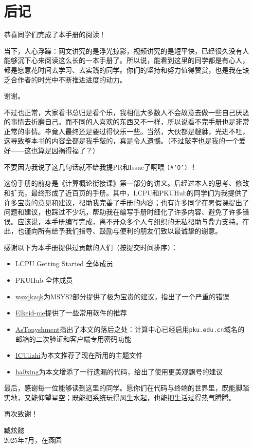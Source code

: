\documentclass[../main.tex]{subfiles}
\begin{document}
\chapter{后记}

恭喜同学们完成了本手册的阅读！

当下，人心浮躁：网文讲究的是浮光掠影，视频讲究的是短平快，已经很久没有人能够沉下心来阅读这么长的一本手册了。所以说，能看到这里的同学都是有心人，都是愿意花时间去学习、去实践的同学。你们的坚持和努力值得赞赏，也是我在缺乏合作者的时光中不断推进进度的动力。

谢谢。

不过也正常，大家看书总归是看个乐，我相信大多数人不会故意去做一些自己厌恶的事情去折磨自己。而不同的人喜欢的东西又不一样，所以说看不完手册也是非常正常的事情。毕竟人最终还是要过得快乐一些。当然，大伙都是貔貅，光进不吐，这导致整本书的内容全都是我手敲的，真是令人遗憾。（不过敲字也是我的一个爱好——这也算是因祸得福了？）

不要因为我说了这几句话就不给我提PR和Issue了啊喂 \texttt{(\#'O')} ！

这份手册的前身是《计算概论衔接课》第一部分的讲义。后经过本人的思考、修改和扩充，最终形成了近百页的手册。其中，LCPU和PKUHub的同学们为我提供了许多宝贵的意见和建议，帮助我完善了手册的内容；也有许多同学在暑假课提出了问题和建议，也踩过不少坑，帮助我在编写手册时细化了许多内容、避免了许多错误。应该说，本手册编写完成，离不开众多个人与组织的无私帮助与鼎力支持。在此，也谨向所有给予我们指导、鼓励与便利的朋友们致以最诚挚的谢意。

感谢以下为本手册提供过贡献的人们（按提交时间排序）：

\begin{itemize}
  \item LCPU Getting Started 全体成员
  \item PKUHub 全体成员
  \item \faGithub\href{https://github.com/wszqkzqk}{wszqkzqk}为MSYS2部分提供了极为宝贵的建议，指出了一个严重的错误
  \item \faGithub\href{https://github.com/Elkeid-me}{Elkeid-me}提供了一些常用软件的推荐
  \item \faGithub\href{https://github.com/AsTonyshment}{AsTonyshment}指出了本文的落后之处：计算中心已经启用\texttt{pku.edu.cn}域名的邮箱的二次验证和客户端专用密码功能
  \item \faGithub\href{https://github.com/ICUlizhi}{ICUlizhi}为本文推荐了现在所用的主题文件
  \item \faGithub\href{https://github.com/ha0xing}{ha0xing}为本文增添了一行遗漏的代码，给出了使用更美观飘号的建议
\end{itemize}

最后，感谢每一位能够读到这里的同学。愿你们在代码与终端的世界里，既能脚踏实地，又能仰望星空；既能把系统玩得风生水起，也能把生活过得热气腾腾。

再次致谢！

\vspace{2em}
\begin{flushright}
  臧炫懿 \\
  2025年7月，在燕园
\end{flushright}
\end{document}
